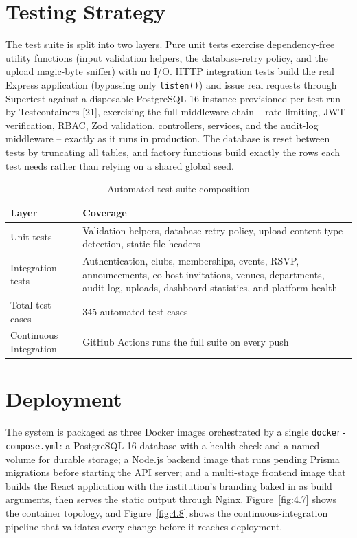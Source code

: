 \documentclass[12pt,oneside]{book}
\begin{document}
\section{Testing Strategy}

The test suite is split into two layers. Pure unit tests exercise dependency-free utility functions (input validation helpers, the database-retry policy, and the upload magic-byte sniffer) with no I/O. HTTP integration tests build the real Express application (bypassing only \texttt{listen()}) and issue real requests through Supertest against a disposable PostgreSQL 16 instance provisioned per test run by Testcontainers [21], exercising the full middleware chain -- rate limiting, JWT verification, RBAC, Zod validation, controllers, services, and the audit-log middleware -- exactly as it runs in production. The database is reset between tests by truncating all tables, and factory functions build exactly the rows each test needs rather than relying on a shared global seed.

\begin{table}[H]
\caption{Automated test suite composition}
\label{tab:4.7}
\centering
\small
\begin{tabularx}{\textwidth}{@{}p{4.5cm}X@{}}
\toprule
Layer & Coverage \\
\midrule
Unit tests & Validation helpers, database retry policy, upload content-type detection, static file headers \\
Integration tests & Authentication, clubs, memberships, events, RSVP, announcements, co-host invitations, venues, departments, audit log, uploads, dashboard statistics, and platform health \\
Total test cases & 345 automated test cases \\
Continuous Integration & GitHub Actions runs the full suite on every push \\
\bottomrule
\end{tabularx}
\end{table}

\section{Deployment}

The system is packaged as three Docker images orchestrated by a single \texttt{docker-compose.yml}: a PostgreSQL 16 database with a health check and a named volume for durable storage; a Node.js backend image that runs pending Prisma migrations before starting the API server; and a multi-stage frontend image that builds the React application with the institution's branding baked in as build arguments, then serves the static output through Nginx. Figure~\ref{fig:4.7} shows the container topology, and Figure~\ref{fig:4.8} shows the continuous-integration pipeline that validates every change before it reaches deployment.
\end{document}
